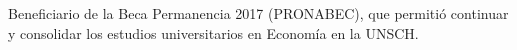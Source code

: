 \begin{scholarship}
	{Beneficiario de la Beca Permanencia 2017 (PRONABEC), que permitió continuar
		y consolidar los estudios universitarios en Economía en la UNSCH.}
	
\end{scholarship}
